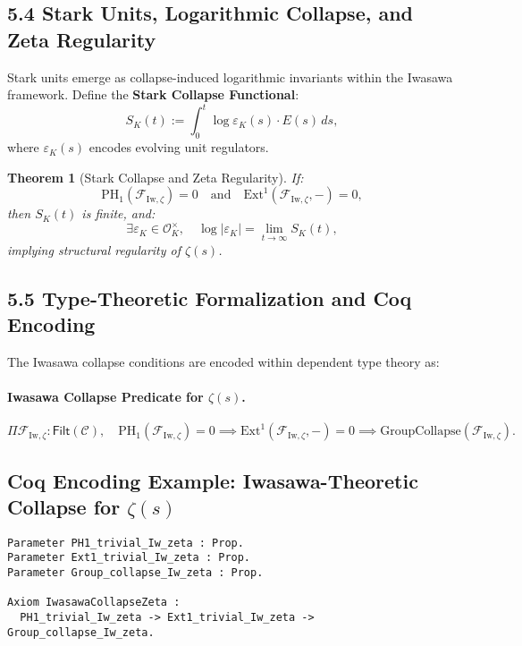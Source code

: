 \documentclass[11pt]{article}
\newtheorem{theorem}{Theorem}[section]
\begin{document}
\subsection*{5.4 Stark Units, Logarithmic Collapse, and Zeta Regularity}

Stark units emerge as collapse-induced logarithmic invariants within the Iwasawa framework. Define the \textbf{Stark Collapse Functional}:
\[
S_K(t) := \int_0^t \log \varepsilon_K(s) \cdot E(s) \, ds,
\]
where $\varepsilon_K(s)$ encodes evolving unit regulators.

\begin{theorem}[Stark Collapse and Zeta Regularity]
If:
\[
\mathrm{PH}_1(\mathcal{F}_{\mathrm{Iw}, \zeta}) = 0 \quad \text{and} \quad \mathrm{Ext}^1(\mathcal{F}_{\mathrm{Iw}, \zeta}, -) = 0,
\]
then $S_K(t)$ is finite, and:
\[
\exists \varepsilon_K \in \mathcal{O}_K^\times, \quad \log |\varepsilon_K| = \lim_{t \to \infty} S_K(t),
\]
implying structural regularity of $\zeta(s)$.
\end{theorem}

\subsection*{5.5 Type-Theoretic Formalization and Coq Encoding}

The Iwasawa collapse conditions are encoded within dependent type theory as:

\paragraph{Iwasawa Collapse Predicate for $\zeta(s)$.}
\[
\Pi \mathcal{F}_{\mathrm{Iw}, \zeta} : \mathsf{Filt}(\mathcal{C}), \quad \mathrm{PH}_1(\mathcal{F}_{\mathrm{Iw}, \zeta}) = 0 \implies \mathrm{Ext}^1(\mathcal{F}_{\mathrm{Iw}, \zeta}, -) = 0 \implies \mathrm{GroupCollapse}(\mathcal{F}_{\mathrm{Iw}, \zeta}).
\]

\subsection*{Coq Encoding Example: Iwasawa-Theoretic Collapse for $\zeta(s)$}

\begin{lstlisting}[language=Coq, caption=Iwasawa-Theoretic Collapse for the Riemann Zeta Function, captionpos=b]
Parameter PH1_trivial_Iw_zeta : Prop.
Parameter Ext1_trivial_Iw_zeta : Prop.
Parameter Group_collapse_Iw_zeta : Prop.

Axiom IwasawaCollapseZeta :
  PH1_trivial_Iw_zeta -> Ext1_trivial_Iw_zeta -> Group_collapse_Iw_zeta.
\end{lstlisting}
\end{document}

